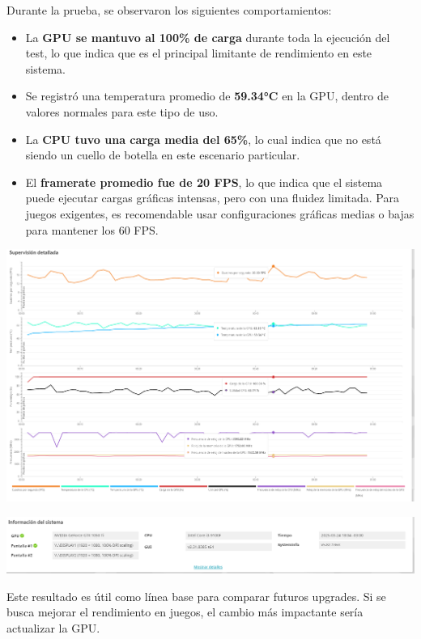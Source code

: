 Durante la prueba, se observaron los siguientes comportamientos:

\begin{itemize}
  \item La \textbf{GPU se mantuvo al 100\% de carga} durante toda la ejecución del test, lo que indica que es el principal limitante de rendimiento en este sistema.
  \item Se registró una temperatura promedio de \textbf{59.34°C} en la GPU, dentro de valores normales para este tipo de uso.
  \item La \textbf{CPU tuvo una carga media del 65\%}, lo cual indica que no está siendo un cuello de botella en este escenario particular.
  \item El \textbf{framerate promedio fue de 20 FPS}, lo que indica que el sistema puede ejecutar cargas gráficas intensas, pero con una fluidez limitada. Para juegos exigentes, es recomendable usar configuraciones gráficas medias o bajas para mantener los 60 FPS.
\end{itemize}

\hspace*{-1.2cm}
\includegraphics[width=1.2\textwidth]{img/3dmarkagu.png}

\begin{center}
\includegraphics[width=1.1\textwidth]{img/informacionpcagu.png}
\end{center}

Este resultado es útil como línea base para comparar futuros upgrades. Si se busca mejorar el rendimiento en juegos, el cambio más impactante sería actualizar la GPU.

